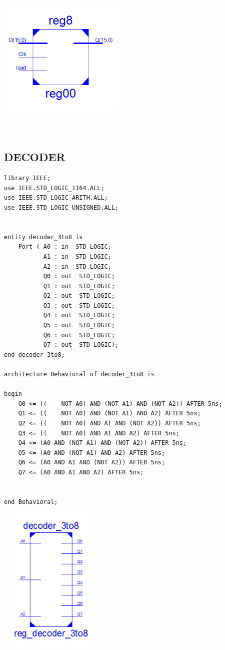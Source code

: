 \documentclass{article}
\begin{document}
\includegraphics[width=6cm, height=8cm]{reg8.png}


\pagebreak
\subsection{DECODER}\label{sec:result}

\begin{lstlisting}
library IEEE;
use IEEE.STD_LOGIC_1164.ALL;
use IEEE.STD_LOGIC_ARITH.ALL;
use IEEE.STD_LOGIC_UNSIGNED.ALL;


entity decoder_3to8 is
    Port ( A0 : in  STD_LOGIC;
           A1 : in  STD_LOGIC;
           A2 : in  STD_LOGIC;
           Q0 : out  STD_LOGIC;
           Q1 : out  STD_LOGIC;
           Q2 : out  STD_LOGIC;
           Q3 : out  STD_LOGIC;
           Q4 : out  STD_LOGIC;
           Q5 : out  STD_LOGIC;
           Q6 : out  STD_LOGIC;
           Q7 : out  STD_LOGIC);
end decoder_3to8;

architecture Behavioral of decoder_3to8 is

begin
	Q0 <= ((	NOT A0) AND (NOT A1) AND (NOT A2)) AFTER 5ns;
	Q1 <= ((	NOT A0) AND (NOT A1) AND A2) AFTER 5ns;
	Q2 <= ((	NOT A0) AND A1 AND (NOT A2)) AFTER 5ns;
	Q3 <= ((	NOT A0) AND A1 AND A2) AFTER 5ns;
	Q4 <= (A0 AND (NOT A1) AND (NOT A2)) AFTER 5ns;
	Q5 <= (A0 AND (NOT A1) AND A2) AFTER 5ns;
	Q6 <= (A0 AND A1 AND (NOT A2)) AFTER 5ns;
	Q7 <= (A0 AND A1 AND A2) AFTER 5ns;


end Behavioral;
\end{lstlisting}

\includegraphics[width=5cm, height=7cm]{decoder.png}
\pagebreak
\end{document}

